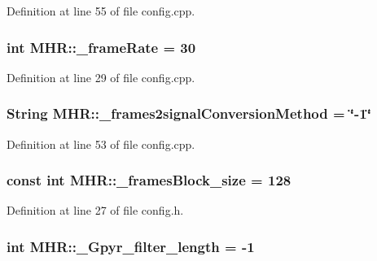 Definition at line 55 of file config.\+cpp.

\hypertarget{namespace_m_h_r_a8c0f2199ebe2a27a2fc0cff1daa239ee}{
\subsubsection[{\+\_\+frame\+Rate}]{\setlength{\rightskip}{0pt plus 5cm}int M\+H\+R\+::\+\_\+frame\+Rate = 30}}\label{namespace_m_h_r_a8c0f2199ebe2a27a2fc0cff1daa239ee}


Definition at line 29 of file config.\+cpp.

\hypertarget{namespace_m_h_r_aaaae88f4be078b944fe63b49c5022684}{
\subsubsection[{\+\_\+frames2signal\+Conversion\+Method}]{\setlength{\rightskip}{0pt plus 5cm}String M\+H\+R\+::\+\_\+frames2signal\+Conversion\+Method = \char`\"{}-\/1\char`\"{}}}\label{namespace_m_h_r_aaaae88f4be078b944fe63b49c5022684}


Definition at line 53 of file config.\+cpp.

\hypertarget{namespace_m_h_r_a167cff7309df5114f9e72af8b5e820c1}{
\subsubsection[{\+\_\+frames\+Block\+\_\+size}]{\setlength{\rightskip}{0pt plus 5cm}const int M\+H\+R\+::\+\_\+frames\+Block\+\_\+size = 128}}\label{namespace_m_h_r_a167cff7309df5114f9e72af8b5e820c1}


Definition at line 27 of file config.\+h.

\hypertarget{namespace_m_h_r_ac3927bf3a2b93c8dc4ef19ee1a3d55f8}{
\subsubsection[{\+\_\+\+Gpyr\+\_\+filter\+\_\+length}]{\setlength{\rightskip}{0pt plus 5cm}int M\+H\+R\+::\+\_\+\+Gpyr\+\_\+filter\+\_\+length = -\/1}}\label{namespace_m_h_r_ac3927bf3a2b93c8dc4ef19ee1a3d55f8}


